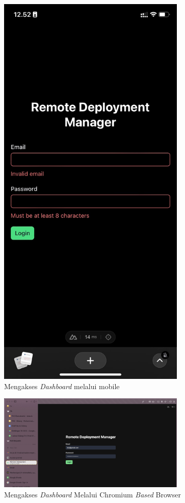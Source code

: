 \begin{figure}[ht]
  \centering
  \includegraphics[width=0.8\textwidth]{resources/chapter-4/pengujian/pengujian-nonfungsional-1.jpg}
  \caption{Mengakses \textit{Dashboard} melalui mobile}
  \label{fig:akses-dashboard-mobile}
\end{figure}

\begin{figure}[ht]
  \centering
  \includegraphics[width=0.8\textwidth]{resources/chapter-4/pengujian/pengujian-nonfungsional-2.jpg}
  \caption{Mengakses \textit{Dashboard} Melalui Chromium \textit{Based} Browser}
  \label{fig:akses-dashboard-chromium}
\end{figure}

